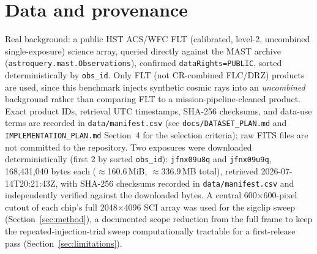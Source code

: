 \documentclass[11pt]{article}
\begin{document}
\section{Data and provenance}
\label{sec:data}
Real background: a public HST ACS/WFC FLT (calibrated, level-2, uncombined
single-exposure) science array, queried directly against the MAST archive
(\texttt{astroquery.mast.Observations}), confirmed
\texttt{dataRights=PUBLIC}, sorted deterministically by \texttt{obs\_id}. Only
FLT (not CR-combined FLC/DRZ) products are used, since this benchmark injects
synthetic cosmic rays into an \emph{uncombined} background rather than
comparing FLT to a mission-pipeline-cleaned product. Exact product IDs,
retrieval UTC timestamps, SHA-256 checksums, and data-use terms are recorded
in \texttt{data/manifest.csv} (see \texttt{docs/DATASET\_PLAN.md} and
\texttt{IMPLEMENTATION\_PLAN.md} Section~4 for the selection criteria); raw
FITS files are not committed to the repository. Two exposures were
downloaded deterministically (first 2 by sorted \texttt{obs\_id}):
\texttt{jfnx09u8q} and \texttt{jfnx09u9q}, 168{,}431{,}040 bytes each
($\approx$160.6\,MiB, $\approx$336.9\,MB total), retrieved
2026-07-14T20:21:43Z, with SHA-256 checksums recorded in
\texttt{data/manifest.csv} and independently verified against the
downloaded bytes. A central 600$\times$600-pixel cutout of each chip's full
2048$\times$4096 SCI array was used for the sigclip sweep
(Section~\ref{sec:method}), a documented scope reduction from the full frame
to keep the repeated-injection-trial sweep computationally tractable for a
first-release pass (Section~\ref{sec:limitations}).
\end{document}
